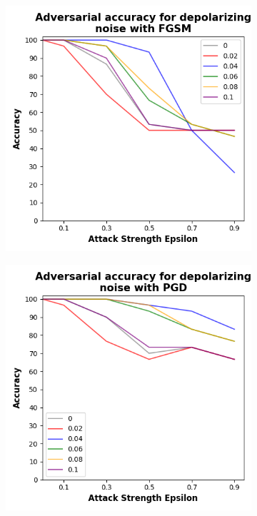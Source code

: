 \begin{figure}[!h]
  \begin{subfigure}{0.45\textwidth}
      \includegraphics[width=\linewidth]{figures/evaluation_results/iris/pqc/figures/depolarizing-fgsm.png}
      \label{fig:iris11}
  \end{subfigure} \qquad
  \begin{subfigure}{0.45\textwidth}
      \includegraphics[width=\linewidth]{figures/evaluation_results/iris/pqc/figures/depolarizing-pgd.png}
      \label{fig:iris12}
  \end{subfigure}


\end{figure}
